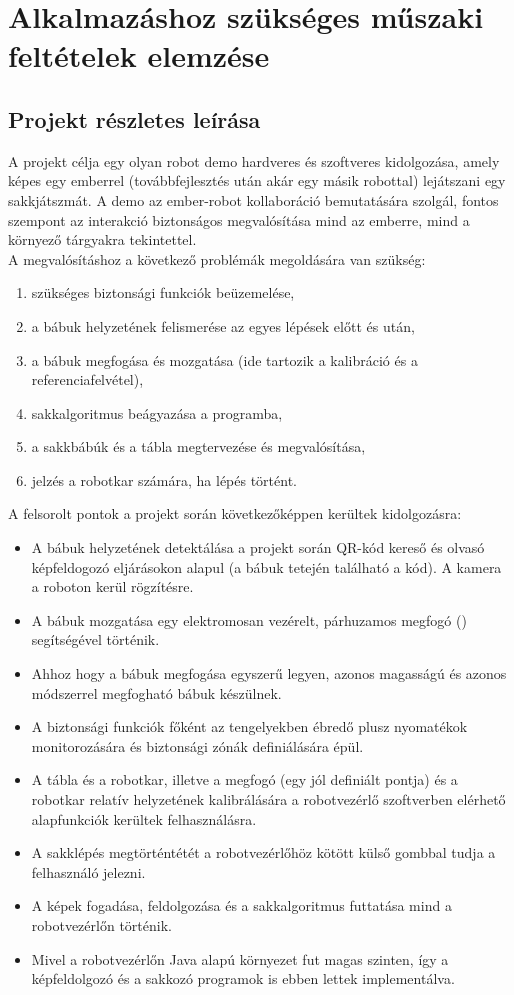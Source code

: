 \documentclass[../documentation.tex]{subfiles}
\begin{document}
\section{Alkalmazáshoz szükséges műszaki feltételek elemzése}
\subsection{Projekt részletes leírása} \label{sec:projectdescription}
A projekt célja egy olyan robot demo hardveres és szoftveres kidolgozása, amely képes egy emberrel (továbbfejlesztés után akár egy másik robottal) lejátszani egy sakkjátszmát. A demo az ember-robot kollaboráció bemutatására szolgál, fontos szempont az interakció biztonságos megvalósítása mind az emberre, mind a környező tárgyakra tekintettel.\\

A megvalósításhoz a következő problémák megoldására van szükség:
\begin{enumerate}
	\item szükséges biztonsági funkciók beüzemelése,
	\item a bábuk helyzetének felismerése az egyes lépések előtt és után,
	\item a bábuk megfogása és mozgatása (ide tartozik a kalibráció és a referenciafelvétel),
	\item sakkalgoritmus beágyazása a programba,
	\item a sakkbábúk és a tábla megtervezése és megvalósítása,
	\item jelzés a robotkar számára, ha lépés történt.
\end{enumerate}
A felsorolt pontok a projekt során következőképpen kerültek kidolgozásra:
\begin{itemize}
	\item A bábuk helyzetének detektálása a projekt során QR-kód kereső és olvasó képfeldogozó eljárásokon alapul (a bábuk tetején található a kód). A kamera a roboton kerül rögzítésre.
	\item A bábuk mozgatása egy elektromosan vezérelt, párhuzamos megfogó () segítségével történik.
	\item Ahhoz hogy a bábuk megfogása egyszerű legyen, azonos magasságú és azonos módszerrel megfogható bábuk készülnek.
	\item A biztonsági funkciók főként az tengelyekben ébredő plusz nyomatékok monitorozására és biztonsági zónák definiálására épül.
	\item A tábla és a robotkar, illetve a megfogó (egy jól definiált pontja) és a robotkar relatív helyzetének kalibrálására a robotvezérlő szoftverben elérhető alapfunkciók kerültek felhasználásra.
	\item A sakklépés megtörténtétét a robotvezérlőhöz kötött külső gombbal tudja a felhasználó jelezni.
	\item A képek fogadása, feldolgozása és a sakkalgoritmus futtatása mind a robotvezérlőn történik.
	\item Mivel a robotvezérlőn Java alapú környezet fut magas szinten, így a képfeldolgozó és a sakkozó programok is ebben lettek implementálva.
\end{itemize}
\end{document}
